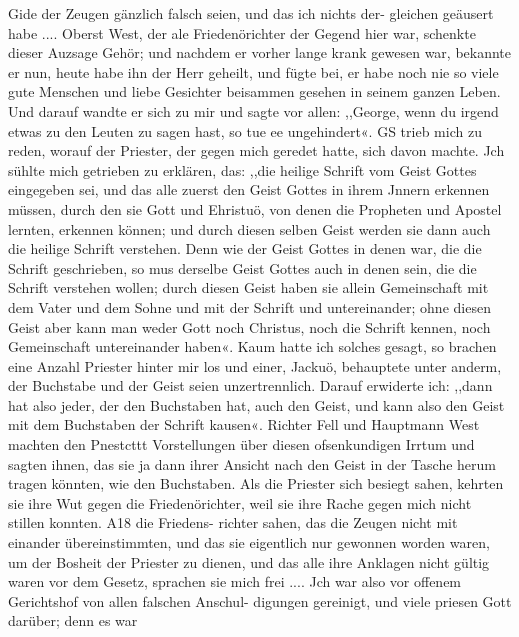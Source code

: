 Gide der Zeugen gänzlich falsch seien, und das ich nichts der-
gleichen geäusert habe .... Oberst West, der ale Friedenörichter
der Gegend hier war, schenkte dieser Auzsage Gehör; und
nachdem er vorher lange krank gewesen war, bekannte er nun,
heute habe ihn der Herr geheilt, und fügte bei, er habe noch nie
so viele gute Menschen und liebe Gesichter beisammen gesehen in
seinem ganzen Leben. Und darauf wandte er sich zu mir und
sagte vor allen: ,,George, wenn du irgend etwas zu den Leuten
zu sagen hast, so tue ee ungehindert«. GS trieb mich zu reden,
worauf der Priester, der gegen mich geredet hatte, sich davon
machte. Jch sühlte mich getrieben zu erklären, das: ,,die heilige
Schrift vom Geist Gottes eingegeben sei, und das alle zuerst
den Geist Gottes in ihrem Jnnern erkennen müssen, durch den
sie Gott und Ehristuö, von denen die Propheten und Apostel
lernten, erkennen können; und durch diesen selben Geist werden
sie dann auch die heilige Schrift verstehen. Denn wie der Geist
Gottes in denen war, die die Schrift geschrieben, so mus derselbe
Geist Gottes auch in denen sein, die die Schrift verstehen wollen;
durch diesen Geist haben sie allein Gemeinschaft mit dem Vater
und dem Sohne und mit der Schrift und untereinander; ohne
diesen Geist aber kann man weder Gott noch Christus, noch die
Schrift kennen, noch Gemeinschaft untereinander haben«. Kaum
hatte ich solches gesagt, so brachen eine Anzahl Priester hinter
mir los und einer, Jackuö, behauptete unter anderm, der
Buchstabe und der Geist seien unzertrennlich. Darauf erwiderte
ich: ,,dann hat also jeder, der den Buchstaben hat, auch den
Geist, und kann also den Geist mit dem Buchstaben der Schrift
kausen«. Richter Fell und Hauptmann West machten den Pnestcttt
Vorstellungen über diesen ofsenkundigen Irrtum und sagten ihnen,
das sie ja dann ihrer Ansicht nach den Geist in der Tasche herum
tragen könnten, wie den Buchstaben. Als die Priester sich besiegt
sahen, kehrten sie ihre Wut gegen die Friedenörichter, weil sie
ihre Rache gegen mich nicht stillen konnten. A18 die Friedens-
richter sahen, das die Zeugen nicht mit einander übereinstimmten,
und das sie eigentlich nur gewonnen worden waren, um der
Bosheit der Priester zu dienen, und das alle ihre Anklagen nicht
gültig waren vor dem Gesetz, sprachen sie mich frei .... Jch
war also vor offenem Gerichtshof von allen falschen Anschul-
digungen gereinigt, und viele priesen Gott darüber; denn es war


